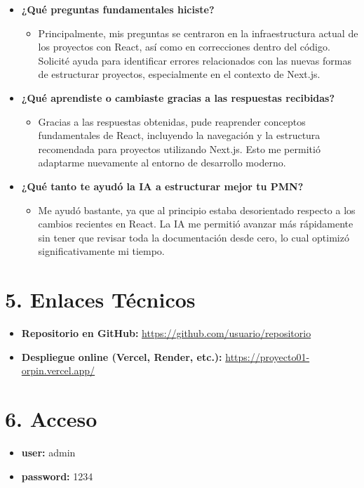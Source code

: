 \documentclass[12pt]{article}
\begin{document}
\begin{itemize}
  \item \textbf{¿Qué preguntas fundamentales hiciste?}
  \begin{itemize}
    \item Principalmente, mis preguntas se centraron en la infraestructura actual de los proyectos con React, así como en correcciones dentro del código. Solicité ayuda para identificar errores relacionados con las nuevas formas de estructurar proyectos, especialmente en el contexto de Next.js.
  \end{itemize}

  \item \textbf{¿Qué aprendiste o cambiaste gracias a las respuestas recibidas?}
  \begin{itemize}
    \item Gracias a las respuestas obtenidas, pude reaprender conceptos fundamentales de React, incluyendo la navegación y la estructura recomendada para proyectos utilizando Next.js. Esto me permitió adaptarme nuevamente al entorno de desarrollo moderno.
  \end{itemize}

  \item \textbf{¿Qué tanto te ayudó la IA a estructurar mejor tu PMN?}
  \begin{itemize}
    \item Me ayudó bastante, ya que al principio estaba desorientado respecto a los cambios recientes en React. La IA me permitió avanzar más rápidamente sin tener que revisar toda la documentación desde cero, lo cual optimizó significativamente mi tiempo.
  \end{itemize}
\end{itemize}


\section*{5. Enlaces Técnicos}

\begin{itemize}
  \item \textbf{Repositorio en GitHub:} \href{https://github.com/perrosxdev/mi-proyecto-web}{https://github.com/usuario/repositorio}
  \item \textbf{Despliegue online (Vercel, Render, etc.):} \href{https://proyecto01-orpin.vercel.app/}{https://proyecto01-orpin.vercel.app/}
\end{itemize}
\section*{6. Acceso}
\begin{itemize}
  \item \textbf{user:} admin
  \item \textbf{password:} 1234
\end{itemize}
\end{document}
